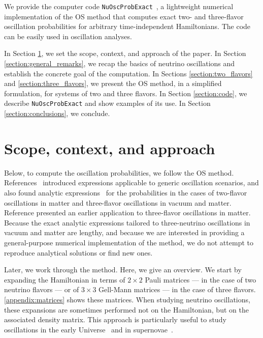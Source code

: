 \documentclass[final,5p,times,twocolumn]{elsarticle}
\begin{document}
We provide the computer code {\tt NuOscProbExact}\ \cite{NuOscProbExact}, a lightweight numerical implementation of the OS method that computes exact two- and three-flavor oscillation probabilities for arbitrary time-independent Hamiltonians.  The code can be easily used in oscillation analyses.  

In Section \ref{section:scope}, we set the scope, context, and approach of the paper.  In Section \ref{section:general_remarks}, we recap the basics of neutrino oscillations and establish the concrete goal of the computation.  In Sections \ref{section:two_flavors} and \ref{section:three_flavors}, we present the OS method, in a simplified formulation, for systems of two and three flavors.  In Section \ref{section:code}, we describe {\tt NuOscProbExact} and show examples of its use.  In Section \ref{section:conclusions}, we conclude.




\section{Scope, context, and approach}
\label{section:scope}

Below, to compute the oscillation probabilities, we follow the OS method.  References\ \cite{Ohlsson:1999xb, Ohlsson:1999um, Ohlsson:2000zz, Ohlsson:2001et} introduced expressions applicable to generic oscillation scenarios, and also found analytic expressions\ \cite{Ohlsson:1999xb} for the probabilities in the cases of two-flavor oscillations in matter and three-flavor oscillations in vacuum and matter.  Reference \cite{Barger:1980tf} presented an earlier application to three-flavor oscillations in matter.  Because the exact analytic expressions tailored to three-neutrino oscillations in vacuum and matter are lengthy, and because we are interested in providing a general-purpose numerical implementation of the method, we do not attempt to reproduce analytical solutions or find new ones.  

Later, we work through the method.  Here, we give an overview.  We start by expanding the Hamiltonian in terms of $2 \times 2$ Pauli matrices --- in the case of two neutrino flavors --- or of $3 \times 3$ Gell-Mann matrices --- in the case of three flavors.  \ref{appendix:matrices} shows these matrices.  When studying neutrino oscillations, these expansions are sometimes performed not on the Hamiltonian, but on the associated density matrix.  This approach is particularly useful to study oscillations in the early Universe\ \cite{McKellar:1992ja, Bell:1998ds, Hannestad:2001iy, Wong:2002fa, Hannestad:2012ky, Boriero:2017tkh} and in supernovae\ \cite{Pantaleone:1994ns, Sigl:1994hc, Pastor:2002we, Balantekin:2004ug, Fogli:2007bk, Dasgupta:2007ws, Duan:2010bg, Mirizzi:2015eza}.  
\end{document}

